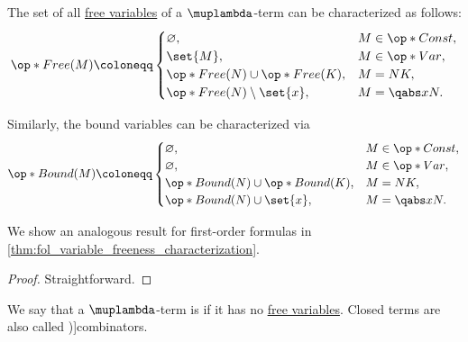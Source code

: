 \begin{proposition}\label{thm:lambda_variable_freeness_characterization}
  The set of all \hyperref[def:lambda_variable_freeness]{free variables} of a \( \muplambda \)-term can be characterized as follows:
  \begin{equation*}
    \op*{Free}(M) \coloneqq \begin{cases}
      \varnothing,                       &M \in \op*{Const}, \\
      \set{ M },                         &M \in \op*{Var}, \\
      \op*{Free}(N) \cup \op*{Free}(K),  &M = N K, \\
      \op*{Free}(N) \setminus \set{ x }, &M = \qabs x N. \\
    \end{cases}
  \end{equation*}

  Similarly, the bound variables can be characterized via
  \begin{equation*}
    \op*{Bound}(M) \coloneqq \begin{cases}
      \varnothing,                        &M \in \op*{Const}, \\
      \varnothing,                        &M \in \op*{Var}, \\
      \op*{Bound}(N) \cup \op*{Bound}(K), &M = N K, \\
      \op*{Bound}(N) \cup \set{ x },      &M = \qabs x N. \\
    \end{cases}
  \end{equation*}
\end{proposition}
\begin{comments}
  \item We show an analogous result for first-order formulas in \cref{thm:fol_variable_freeness_characterization}.
\end{comments}
\begin{proof}
  Straightforward.
\end{proof}

\begin{definition}\label{def:lambda_combinator}
  We say that a \( \muplambda \)-term is  if it has no \hyperref[def:lambda_variable_freeness]{free variables}. Closed terms are also called \term[ru=комбинаторы (\cite[269]{Герасимов2014Вычислимость})]{combinators}.
\end{definition}


